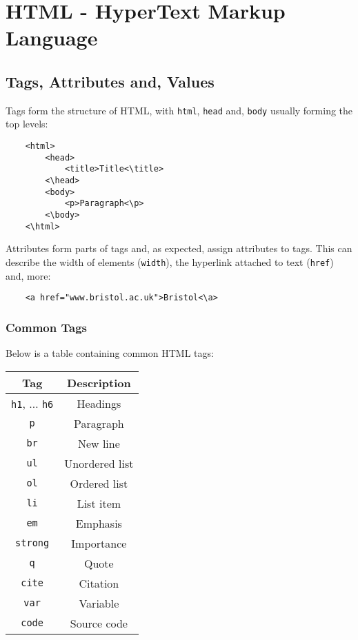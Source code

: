 \section{HTML - HyperText Markup Language}

\subsection{Tags, Attributes and, Values}

Tags form the structure of HTML, with \texttt{html},
\texttt{head} and, \texttt{body} usually forming the top
levels: \begin{lstlisting}
    <html>
        <head>
            <title>Title<\title>
        <\head>
        <body>
            <p>Paragraph<\p>
        <\body>
    <\html>
\end{lstlisting} Attributes form parts of tags and, as expected,
assign attributes to tags. This can describe the width of elements
(\texttt{width}), the hyperlink attached to text (\texttt{href}) and,
more: \begin{lstlisting}
    <a href="www.bristol.ac.uk">Bristol<\a>
\end{lstlisting}

\subsubsection{Common Tags}

Below is a table containing common HTML tags: \begin{center}
    \begin{tabular}{| c | c |}
        \hline
        Tag & Description \\
        \hline \hline
        \texttt{h1}, $\ldots$ \texttt{h6} & Headings \\
        \hline
        \texttt{p} & Paragraph \\
        \hline
        \texttt{br} & New line \\
        \hline
        \texttt{ul} & Unordered list \\
        \hline
        \texttt{ol} & Ordered list \\
        \hline
        \texttt{li} & List item \\
        \hline
        \texttt{em} & Emphasis \\
        \hline
        \texttt{strong} & Importance \\
        \hline
        \texttt{q} & Quote \\
        \hline
        \texttt{cite} & Citation \\
        \hline
        \texttt{var} & Variable \\
        \hline
        \texttt{code} & Source code \\
        \hline
    \end{tabular}
\end{center}

